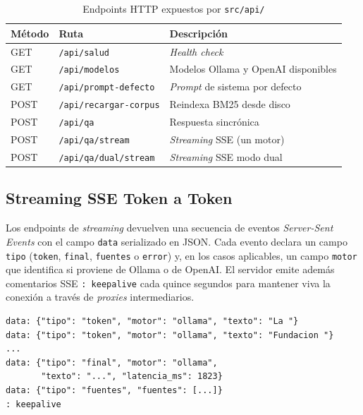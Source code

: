 \documentclass[conference]{IEEEtran}
\newcommand{\code}[1]{\texttt{\small #1}}
\begin{document}
\begin{table}[ht]
\centering
\caption{Endpoints HTTP expuestos por \code{src/api/}}
\label{tab:endpoints}
\setlength{\tabcolsep}{4pt}
\begin{tabular}{@{}lll@{}}
\toprule
\textbf{Método} & \textbf{Ruta} & \textbf{Descripción} \\
\midrule
GET  & \code{/api/salud}          & \textit{Health check}              \\
GET  & \code{/api/modelos}        & Modelos Ollama y OpenAI disponibles \\
GET  & \code{/api/prompt-defecto} & \textit{Prompt} de sistema por defecto \\
POST & \code{/api/recargar-corpus}& Reindexa BM25 desde disco          \\
POST & \code{/api/qa}             & Respuesta sincrónica               \\
POST & \code{/api/qa/stream}      & \textit{Streaming} SSE (un motor)  \\
POST & \code{/api/qa/dual/stream} & \textit{Streaming} SSE modo dual   \\
\bottomrule
\end{tabular}
\end{table}

\subsection{Streaming SSE Token a Token}

Los endpoints de \textit{streaming} devuelven una secuencia de eventos
\textit{Server-Sent Events} con el campo \code{data} serializado en JSON.
Cada evento declara un campo \code{tipo} (\code{token}, \code{final},
\code{fuentes} o \code{error}) y, en los casos aplicables, un campo
\code{motor} que identifica si proviene de Ollama o de OpenAI. El servidor
emite además comentarios SSE \code{: keepalive} cada quince segundos para
mantener viva la conexión a través de \textit{proxies} intermediarios.

\begin{lstlisting}[caption={Ejemplo simplificado de flujo SSE emitido
por \code{POST /api/qa/stream}}, label={lst:sse_flow}]
data: {"tipo": "token", "motor": "ollama", "texto": "La "}
data: {"tipo": "token", "motor": "ollama", "texto": "Fundacion "}
...
data: {"tipo": "final", "motor": "ollama",
       "texto": "...", "latencia_ms": 1823}
data: {"tipo": "fuentes", "fuentes": [...]}
: keepalive
\end{lstlisting}
\end{document}
